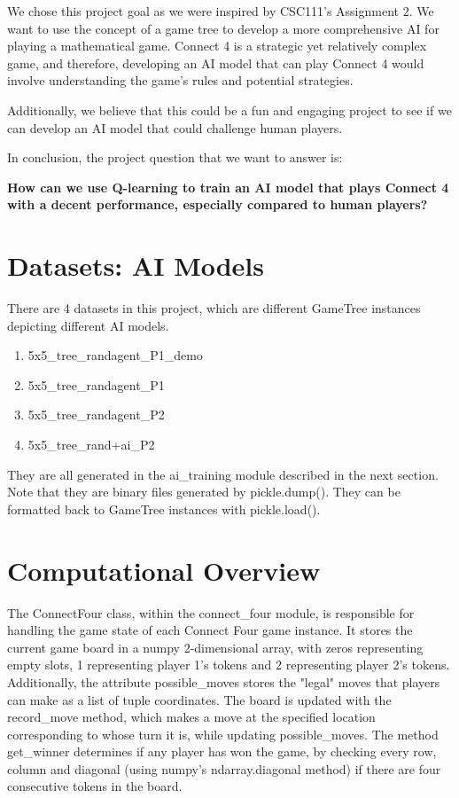 \documentclass{article}
\begin{document}
We chose this project goal as we were inspired by CSC111’s Assignment 2. We want to use the concept of a game tree to develop a more comprehensive AI for playing a mathematical game. Connect 4 is a strategic yet relatively complex game, and therefore, developing an AI model that can play Connect 4 would involve understanding the game’s rules and potential strategies.

Additionally, we believe that this could be a fun and engaging project to see if we can develop an AI model that could challenge human players.

In conclusion, the project question that we want to answer is:

\textbf{How can we use Q-learning to train an AI model that plays Connect 4 with a decent performance, especially compared to human players?}


\section{Datasets: AI Models}

There are 4 datasets in this project, which are different GameTree instances depicting different AI models.

\begin{enumerate}
    \item 5x5\_tree\_randagent\_P1\_demo
    \item 5x5\_tree\_randagent\_P1
    \item 5x5\_tree\_randagent\_P2
    \item 5x5\_tree\_rand+ai\_P2
\end{enumerate}

They are all generated in the ai\_training module described in the next section. Note that they are binary files generated by pickle.dump(). They can be formatted back to GameTree instances with pickle.load().


\section{Computational Overview}

The ConnectFour class, within the connect\_four module, is responsible for handling the game state of each Connect Four game instance. It stores the current game board in a numpy 2-dimensional array, with zeros representing empty slots, 1 representing player 1's tokens and 2 representing player 2's tokens. Additionally, the attribute possible\_moves stores the "legal" moves that players can make as a list of tuple coordinates. The board is updated with the record\_move method, which makes a move at the specified location corresponding to whose turn it is, while updating possible\_moves. The method get\_winner determines if any player has won the game, by checking every row, column and diagonal (using numpy's ndarray.diagonal method) if there are four consecutive tokens in the board.
\end{document}
